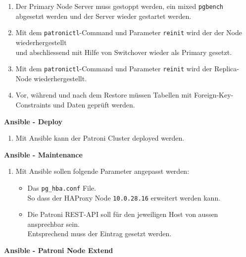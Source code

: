 \begin{flushleft}
\begin{description}
        \begin{enumerate}[resume]
            \item Der Primary Node Server muss gestoppt werden, ein mixed \texttt{pgbench} abgesetzt werden und der Server wieder gestartet werden.
            \item Mit dem \texttt{patronictl}-Command und Parameter \texttt{reinit} wird der der Node wiederhergestellt\\und abschliessend mit Hilfe von Switchover wieder als Primary gesetzt.
            \item Mit dem \texttt{patronictl}-Command und Parameter \texttt{reinit} wird der Replica-Node wiederhergestellt.
            \item Vor, während und nach dem Restore müssen Tabellen mit Foreign-Key-Constraints und Daten geprüft werden.
        \end{enumerate}
        \item \textbf{Ansible - Deploy}\hfill \\
        \begin{enumerate}[resume]
            \item Mit \Gls{Ansible} kann der Patroni Cluster deployed werden.
        \end{enumerate}
        \item \textbf{Ansible - Maintenance}\hfill \\
        \begin{enumerate}[resume]
            \item Mit \Gls{Ansible} sollen folgende Parameter angepasst werden:
            \begin{itemize}
                \item Das \texttt{pg\_hba.conf} File.\\So dass der \Gls{HAProxy} Node \texttt{10.0.28.16} erweitert werden kann.
                \item Die Patroni REST-API soll für den jeweiligen Host von aussen ansprechbar sein.\\Entsprechend muss der Eintrag gesetzt werden.
            \end{itemize}
        \end{enumerate}
        \item \textbf{Ansible - Patroni Node Extend}\hfill \\
        \begin{enumerate}[resume]

\end{enumerate}
\end{description}
\end{flushleft}

